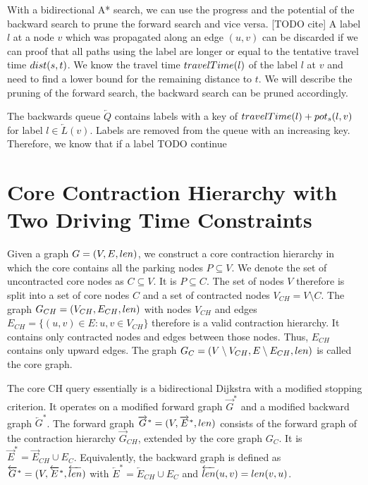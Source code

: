 With a bidirectional A* search, we can use the progress and the potential of the backward search to prune the forward search and vice versa. [TODO cite] A label $l$ at a node $v$ which was propagated along an edge $(u,v)$ can be discarded if we can proof that all paths using the label are longer or equal to the tentative travel time $dist(s,t)$. We know the travel time $travelTime(l)$ of the label $l$ at $v$ and need to find a lower bound for the remaining distance to $t$. We will describe the pruning of the forward search, the backward search can be pruned accordingly.

The backwards queue $\overleftarrow{Q}$ contains labels with a key of $travelTime(l) + pot_s(l,v)$ for label $l \in \overleftarrow{L}(v)$. Labels are removed from the queue with an increasing key. Therefore, we know that if a label  TODO continue

\section{Core Contraction Hierarchy with Two Driving Time Constraints}
Given a graph $G = (V,E,len)$, we construct a core contraction hierarchy in which the core contains all the parking nodes $P \subseteq V$. We denote the set of uncontracted core nodes as $C \subseteq V$. It is $P \subseteq C$. The set of nodes $V$ therefore is split into a set of core nodes $C$ and a set of contracted nodes $V_{CH} = V \setminus C$. The graph $G_{CH} = (V_{CH},E_{CH},len)$ with nodes $V_{CH}$ and edges $E_{CH} = \{(u,v) \in E : u,v \in V_{CH}\}$ therefore is a valid contraction hierarchy. It contains only contracted nodes and edges between those nodes. Thus, $E_{CH}$ contains only upward edges. The graph $G_{C} = (V \setminus V_{CH},E \setminus E_{CH},len)$ is called the core graph.

The core CH query essentially is a bidirectional Dijkstra with a modified stopping criterion. It operates on a modified forward graph $\overrightarrow{G}^*$ and a modified backward graph $\overleftarrow{G}^*$. The forward graph $\overrightarrow{G}^* = (V,\overrightarrow{E}^*,len)$ consists of the forward graph of the contraction hierarchy $\overrightarrow{G}_{CH}$, extended by the core graph $G_C$. It is $\overrightarrow{E}^* = \overrightarrow{E}_{CH} \cup E_C $. Equivalently, the backward graph is defined as $\overleftarrow{G}^* = (V,\overleftarrow{E}^*,\overleftarrow{len})$ with $\overleftarrow{E}^* = \overleftarrow{E}_{CH} \cup E_C$ and $\overleftarrow{len}(u,v) = len(v,u)$.

